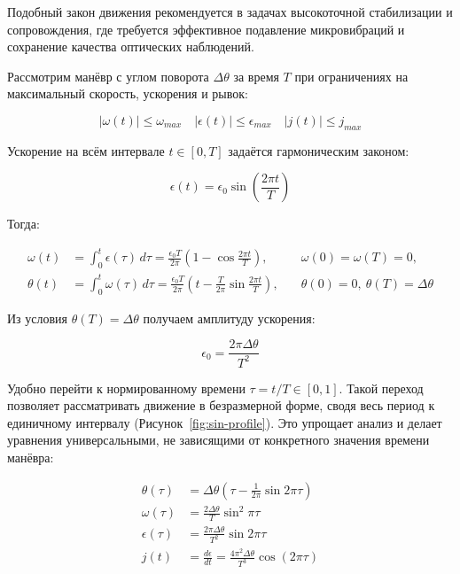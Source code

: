 Подобный закон движения рекомендуется в задачах высокоточной стабилизации и сопровождения, где требуется эффективное подавление микровибраций и сохранение качества оптических наблюдений.

Рассмотрим манёвр с углом поворота $\Delta \theta$ за время $T$ при ограничениях на максимальный скорость, ускорения и рывок:

\begin{equation}
	\label{eq:restrictions}	
	|\omega(t)| \leq \omega_{max} \quad |\epsilon(t)| \leq \epsilon_{max} \quad |j(t)| \leq j_{max}
\end{equation}

Ускорение на всём интервале $t \in [0, T]$ задаётся гармоническим законом:

\begin{equation}
	\epsilon(t) = \epsilon_0 \sin\!\left(\frac{2 \pi t}{T}\right)
\end{equation}

Тогда:

\begin{equation}
	\begin{aligned}
		\omega(t) &= \int_{0}^{t} \epsilon(\tau)\, d\tau
		= \frac{\epsilon_0 T}{2 \pi} \!\left( 1 - \cos \frac{2 \pi t}{T} \right),
		&\quad \omega(0) = \omega(T) = 0, \\[6pt]
		\theta(t) &= \int_{0}^{t} \omega(\tau)\, d\tau
		= \frac{\epsilon_0 T}{2 \pi} \!\left( t - \frac{T}{2 \pi} \sin \frac{2 \pi t}{T} \right),
		&\quad \theta(0) = 0,\ \theta(T) = \Delta \theta
	\end{aligned}
\end{equation}


Из условия $\theta(T) = \Delta \theta$ получаем амплитуду ускорения:

\begin{equation}
	\epsilon_{0} = \frac{2 \pi \Delta \theta}{T^{2}}
\end{equation}

Удобно перейти к нормированному времени $\tau=t/T \in [0,1]$. Такой переход позволяет рассматривать движение в безразмерной форме, сводя весь период к единичному интервалу (Рисунок~\cref{fig:sin-profile}). Это упрощает анализ и делает уравнения универсальными, не зависящими от конкретного значения времени манёвра:

\begin{equation}
	\begin{aligned}
		\theta(\tau) &= \Delta \theta \!\left( \tau - \frac{1}{2 \pi} \sin 2 \pi \tau \right) \\
		\omega(\tau) &= \frac{2 \Delta \theta}{T} \sin^{2} \pi \tau \\
		\epsilon(\tau) &= \frac{2 \pi \Delta \theta}{T^{2}} \sin 2 \pi \tau \\
		j(t) &= \frac{d \epsilon}{d t} = \frac{4 \pi^{2} \Delta \theta}{T^{3}} \cos\!\left(2 \pi \tau\right)\\
	\end{aligned}
\end{equation}

